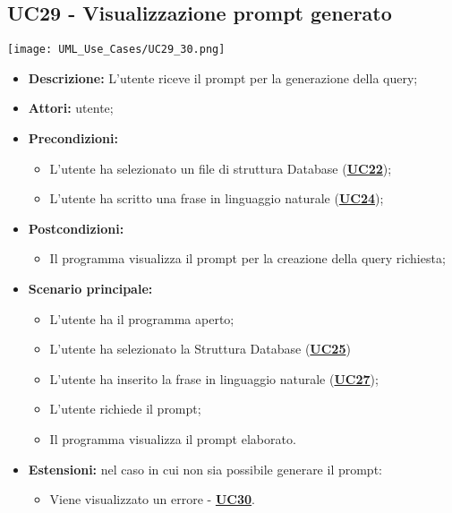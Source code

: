 \subsection{UC29 - Visualizzazione prompt generato}
\label{sec:UC29}
\texttt{[image: UML\_Use\_Cases/UC29\_30.png]}
\begin{itemize}
	\item \textbf{Descrizione:} L’utente riceve il prompt per la generazione della query;
	\item \textbf{Attori:} utente;
	\item \textbf{Precondizioni:} 
	\begin{itemize}
		\item L’utente ha selezionato un file di struttura Database (\hyperref[sec:UC25]{\textbf{UC22}});
		\item L’utente ha scritto una frase in linguaggio naturale (\hyperref[sec:UC27]{\textbf{UC24}});
	\end{itemize}
	\item \textbf{Postcondizioni:} 
	\begin{itemize}
		\item Il programma visualizza il prompt per la creazione della query richiesta;
	\end{itemize}
	\item \textbf{Scenario principale:} 
	\begin{itemize}
		\item L’utente ha il programma aperto;
		\item L’utente ha selezionato la Struttura Database (\hyperref[sec:UC25]{\textbf{UC25}})
		\item L'utente ha inserito la frase in linguaggio naturale (\hyperref[sec:UC27]{\textbf{UC27}});
		\item L’utente richiede il prompt;
		\item Il programma visualizza il prompt elaborato.
	\end{itemize}
	\item \textbf{Estensioni:} nel caso in cui non sia possibile generare il prompt:
	\begin{itemize}
		\item Viene visualizzato un errore - \hyperref[sec:UC30]{\textbf{UC30}}.
	\end{itemize}
\end{itemize}

